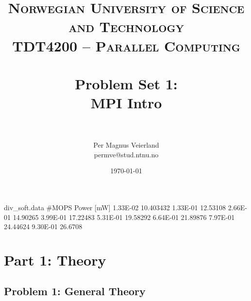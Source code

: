 

\title{	
\normalfont \normalsize 
\textsc{Norwegian University of Science and Technology\\TDT4200 -- Parallel Computing} \\ [25pt]
\horrule{0.5pt} \\[0.4cm]
\huge Problem Set 1:\\ MPI Intro\\
\horrule{2pt} \\[0.5cm]
}

\author{Per Magnus Veierland\\permve@stud.ntnu.no}


\date{\normalsize\today}


\begin{filecontents}{div_soft.data}
#MOPS   Power [mW]
1.33E-02    10.403432
1.33E-01    12.53108
2.66E-01    14.90265
3.99E-01    17.22483
5.31E-01    19.58292
6.64E-01    21.89876
7.97E-01    24.44624
9.30E-01    26.6708
\end{filecontents}


\maketitle

\section*{Part 1: Theory}

\subsection*{Problem 1: General Theory}

